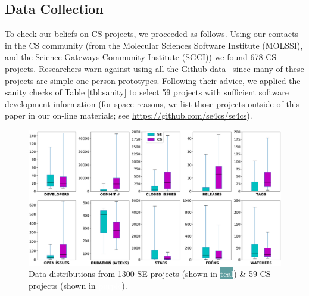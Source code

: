 \documentclass[sigconf,review,anonymous]{acmart}
\begin{document}
 
 
\subsection{Data Collection}\label{tion:data}


To check our beliefs on CS projects, we proceeded as follows. 
Using our contacts in the CS community
(from the Molecular Sciences Software Institute (MOLSSI), and the Science Gateways Community Institute (SGCI)) we found
678 CS  projects.
Researchers
warn against using all the Github data~\cite{bird09promise,agrawal2018we, eirini15promise, munaiah17curating} since
many of these projects are simple one-person prototypes.
Following  their advice, we applied the sanity checks of Table \ref{tbl:sanity}
to select 59  projects with sufficient software development information
(for space reasons, we list those projects outside of this paper in our on-line materials; see \url{https://github.com/se4cs/se4cs}).
 
\begin{figure}[!t]
\vspace{5pt}
\centering \includegraphics[width=\linewidth]{img/Figure_1.png}
\caption{Data distributions from 1300 SE projects (shown in \colorbox{cadetblue}{ \textcolor{white}{teal}}) \& 59 CS projects (shown in \colorbox{amethyst}{ \textcolor{white}{purple}}).}\label{fig:comparison}
\end{figure}    
\end{document}
